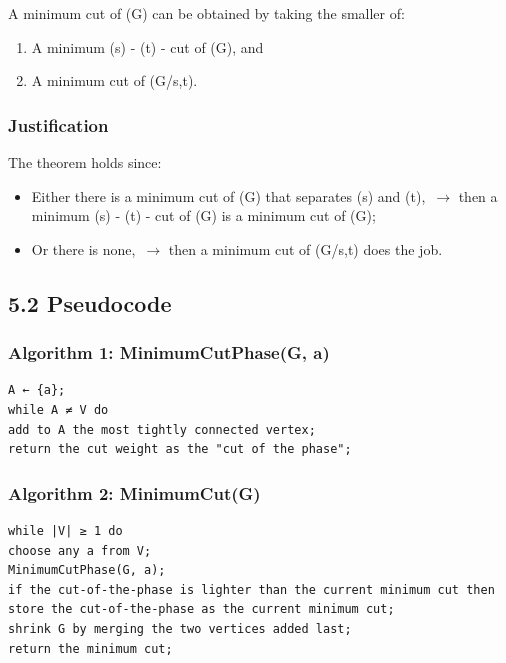 \documentclass[12pt]{article}
\begin{document}
A minimum cut of (G) can be obtained by taking the smaller of:

\begin{enumerate}
\item A minimum (s) - (t) - cut of (G), and
\item A minimum cut of (G/{s,t}).
\end{enumerate}

\bigskip

\subsubsection*{Justification}

The theorem holds since:

\begin{itemize}
\item Either there is a minimum cut of (G) that separates (s) and (t),\
$\rightarrow$ then a minimum (s) - (t) - cut of (G) is a minimum cut of (G);

\item Or there is none,\
$\rightarrow$ then a minimum cut of (G/{s,t}) does the job.
\end{itemize}

\bigskip

\subsection*{5.2 Pseudocode}

\subsubsection*{Algorithm 1: MinimumCutPhase(G, a)}

\begin{verbatim}
A ← {a};
while A ≠ V do
add to A the most tightly connected vertex;
return the cut weight as the "cut of the phase";
\end{verbatim}

\bigskip

\subsubsection*{Algorithm 2: MinimumCut(G)}

\begin{verbatim}
while |V| ≥ 1 do
choose any a from V;
MinimumCutPhase(G, a);
if the cut-of-the-phase is lighter than the current minimum cut then
store the cut-of-the-phase as the current minimum cut;
shrink G by merging the two vertices added last;
return the minimum cut;
\end{verbatim}
\end{document}
